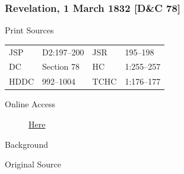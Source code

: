 		\subsubsection{Revelation, 1 March 1832 [D\&C 78]}
			\label{EMS-1832-JS-1-MAR-1832}
		
			\begin{description}
				\item[Print Sources]
			\end{description}

				\begin{tabular}{p{0.5in}p{1in}p{0.5in}p{1in}}
				JSP	 	& D2:197--200	& JSR 		& 195--198 \\
				DC	 	& Section 78 	& HC 		& 1:255--257 \\
				HDDC 	& 992--1004		& TCHC 		& 1:176--177 \\
				\end{tabular}
			
			\begin{description}
				\item[Online Access] \href{https://www.josephsmithpapers.org/paper-summary/revelation-1-march-1832-dc-78/1}{Here}
			\end{description}
			
			\begin{description}
				\item[Background]
			\end{description}
			
			
			\begin{description}
				\item[Original Source]
			\end{description}
			
			
